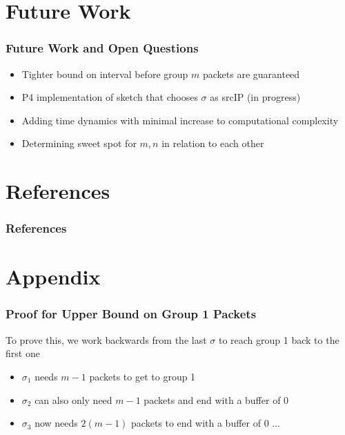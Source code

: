\documentclass{beamer}
\begin{document}
\section{Future Work}
\begin{frame}
  \frametitle{Future Work and Open Questions}
  \begin{itemize}
    \item Tighter bound on interval before group $m$ packets are guaranteed
    \item P4 implementation of sketch that chooses $\sigma$ as srcIP (in progress)
    \item Adding time dynamics with minimal increase to computational complexity
    \item Determining sweet spot for $m, n$ in relation to each other
  \end{itemize}
\end{frame}

\section{References}
\begin{frame}
  \tiny
  \frametitle{References}
  
  
\end{frame}


\section{Appendix}
\begin{frame}
  \frametitle{Proof for Upper Bound on Group 1 Packets}
  To prove this, we work backwards from the last $\sigma$ to reach group 1 back to the first one
  \begin{itemize}
    \item <2-> $\sigma_1$ needs $m - 1$ packets to get to group 1
    \item <3-> $\sigma_2$ can also only need $m - 1$ packets and end with a buffer of 0
    \item <4-> $\sigma_3$ now needs $2(m - 1)$ packets to end with a buffer of 0 ...
  \end{itemize}
\end{frame}
\end{document}
